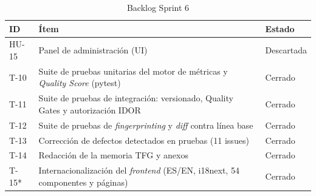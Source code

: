 \begin{table}[H]
  \centering
  \small
  \caption{Backlog Sprint 6}
  \begin{tabularx}{\textwidth}{l X l}
    \toprule
    \textbf{ID} & \textbf{Ítem} & \textbf{Estado} \\
    \midrule
    HU-15 & Panel de administración (\ac{UI}) & Descartada \\
    T-10  & Suite de pruebas unitarias del motor de métricas y \emph{Quality Score} (pytest) & Cerrado \\
    T-11  & Suite de pruebas de integración: versionado, Quality Gates y autorización \ac{IDOR} & Cerrado \\
    T-12  & Suite de pruebas de \emph{fingerprinting} y \emph{diff} contra línea base & Cerrado \\
    T-13  & Corrección de defectos detectados en pruebas (11 issues) & Cerrado \\
    T-14  & Redacción de la memoria \ac{TFG} y anexos & Cerrado \\
    T-15* & Internacionalización del \emph{frontend} (ES/EN, i18next, 54 componentes y páginas) & Cerrado \\
    \bottomrule
  \end{tabularx}
\end{table}


